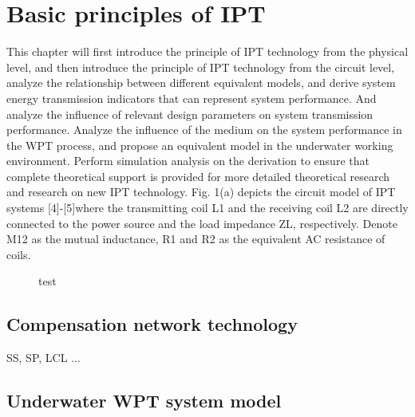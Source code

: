 \chapter{Basic principles of IPT}
This chapter will first introduce the principle of IPT technology from the physical level, and then introduce the principle of IPT technology from the circuit level, analyze the relationship between different equivalent models, and derive system energy transmission indicators that can represent system performance. And analyze the influence of relevant design parameters on system transmission performance. Analyze the influence of the medium on the system performance in the WPT process, and propose an equivalent model in the underwater working environment. Perform simulation analysis on the derivation to ensure that complete theoretical support is provided for more detailed theoretical research and research on new IPT technology.
Fig. 1(a) depicts the circuit model of IPT systems [4]-[5]where the transmitting coil L1 and the receiving coil L2 are
directly connected to the power source and the load impedance
ZL, respectively. Denote M12 as the mutual inductance, R1 and
R2 as the equivalent AC resistance of coils.

\begin{figure}
    \centering
    \caption{test}
\end{figure}

\section{Compensation network technology}


SS, SP, LCL ...
\section{Underwater WPT system model}